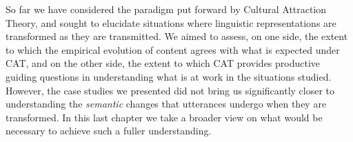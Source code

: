 \documentclass[english,]{article}
\begin{document}
So far we have considered the paradigm put forward by Cultural Attraction Theory, and sought to elucidate situations where linguistic representations are transformed as they are transmitted.
We aimed to assess, on one side, the extent to which the empirical evolution of content agrees with what is expected under CAT, and on the other side, the extent to which CAT provides productive guiding questions in understanding what is at work in the situations studied.
However, the case studies we presented did not bring us significantly closer to understanding the \emph{semantic} changes that utterances undergo when they are transformed.
In this last chapter we take a broader view on what would be necessary to achieve such a fuller understanding.
\end{document}

